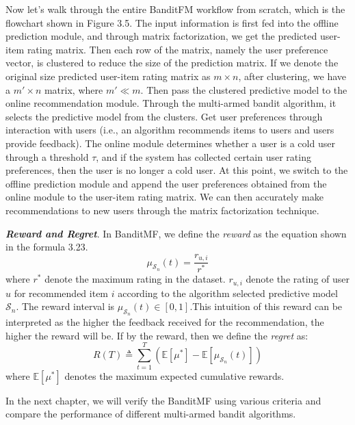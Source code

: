 Now let's walk through the entire BanditFM workflow from scratch, which is the flowchart shown in Figure 3.5. The input information is first fed into the offline prediction module, and through matrix factorization, we get the predicted user-item rating matrix. Then each row of the matrix, namely the user preference vector, is clustered to reduce the size of the prediction matrix. If we denote the original size predicted user-item rating matrix as $m\times n$, after clustering, we have a ${m}'\times n$ matrix, where ${m}'\ll m$. Then pass the clustered predictive model to the online recommendation module. Through the multi-armed bandit algorithm, it selects the predictive model from the clusters. Get user preferences through interaction with users (i.e., an algorithm recommends items to users and users provide feedback). The online module determines whether a user is a cold user through a threshold $\tau $, and if the system has collected certain user rating preferences, then the user is no longer a cold user. At this point, we switch to the offline prediction module and append the user preferences obtained from the online module to the user-item rating matrix. We can then accurately make recommendations to new users through the matrix factorization technique.

\textbf{\textit{Reward and Regret}}. In BanditMF, we define the \textit{reward} as the equation shown in the formula 3.23.
\begin{equation}
    \mu_{\mathcal{S}_{n}}\left ( t \right ) =\frac{r_{u,i}}{r^*}
\end{equation}
where $r^*$ denote the maximum rating in the dataset. $r_{u,i}$ denote the rating of user $u$ for recommended item $i$ according to the algorithm selected predictive model $\mathcal{S}_{n}$. The reward interval is $\mu_{\mathcal{S}_{n}}\left ( t \right )\in [0,1]$.This intuition of this reward can be interpreted as the higher the feedback received for the recommendation, the higher the reward will be. If by the reward, then we define the \textit{regret} as:
\begin{equation}
    R(T) \triangleq \sum_{t=1}^{T}\left(\mathbb{E}\left[\mu^*\right]-\mathbb{E}\left[\mu_{\mathcal{S}_{n}}\left ( t \right )\right]\right)
\end{equation}
where $\mathbb{E}\left[\mu^*\right]$ denotes the maximum expected cumulative rewards.

In the next chapter, we will verify the BanditMF using various criteria and compare the performance of different multi-armed bandit algorithms.